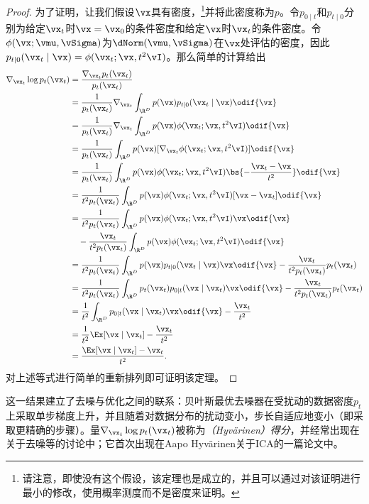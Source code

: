 \documentclass[../../book-main_zh.tex]{subfiles}
\begin{document}
\begin{proof}
    为了证明，让我们假设\(\vx\)具有密度，\footnote{请注意，即使没有这个假设，该定理也是成立的，并且可以通过对该证明进行最小的修改，使用概率测度而不是密度来证明。}并将此密度称为\(p\)。令\(p_{0 \mid t}\)和\(p_{t \mid 0}\)分别为给定\(\vx_{t}\)时\(\vx
    = \vx_{0}\)的条件密度和给定\(\vx\)时\(\vx_{t}\)的条件密度。令\(\phi(\vx ; \vmu, \vSigma)\)为\(\dNorm(\vmu,
    \vSigma)\)在\(\vx\)处评估的密度，因此\(p_{t \mid 0}(\vx_{t} \mid \vx)
    = \phi(\vx_{t} ; \vx, t^{2}\vI)\)。那么简单的计算给出
    \begin{align}
        \nabla_{\vx_{t}} \log p_{t}(\vx_{t})
        &= \frac{\nabla_{\vx_{t}}p_{t}(\vx_{t})}{p_{t}(\vx_{t})} \\
        &=
        \frac{1}{p_{t}(\vx_{t})}\nabla_{\vx_{t}}\int_{\R^{D}}p(\vx)p_{t
        \mid 0}(\vx_{t} \mid \vx)\odif{\vx} \\
        &=
        \frac{1}{p_{t}(\vx_{t})}\nabla_{\vx_{t}}\int_{\R^{D}}p(\vx)\phi(\vx_{t}
        ;\vx, t^{2}\vI)\odif{\vx} \\
        &=
        \frac{1}{p_{t}(\vx_{t})}\int_{\R^{D}}p(\vx)[\nabla_{\vx_{t}}\phi(\vx_{t}
        ;\vx, t^{2}\vI)]\odif{\vx} \\
        &= \frac{1}{p_{t}(\vx_{t})}\int_{\R^{D}}p(\vx)\phi(\vx_{t} ;
        \vx, t^{2}\vI)\bs{-\frac{\vx_{t} - \vx}{t^{2}}}\odif{\vx} \\
        &=
        \frac{1}{t^{2}p_{t}(\vx_{t})}\int_{\R^{D}}p(\vx)\phi(\vx_{t}
        ; \vx, t^{2}\vI)[\vx - \vx_{t}]\odif{\vx} \\
        &= \frac{1}{t^{2}p_{t}(\vx_{t})}\int_{\R^{D}}p(\vx)\phi(\vx_{t} ; \vx,
        t^{2}\vI)\vx \odif{\vx} \\
        & \quad -
        \frac{\vx_{t}}{t^{2}p_{t}(\vx_{t})}\int_{\R^{D}}p(\vx)\phi(\vx_{t}
        ; \vx, t^{2}\vI)\odif{\vx}\nonumber \\
        &= \frac{1}{t^{2}p_{t}(\vx_{t})}\int_{\R^{D}}p(\vx)p_{t \mid
        0}(\vx_{t} \mid \vx)\vx \odif{\vx} -
        \frac{\vx_{t}}{t^{2}p_{t}(\vx_{t})}p_{t}(\vx_{t}) \\
        &=
        \frac{1}{t^{2}p_{t}(\vx_{t})}\int_{\R^{D}}p_{t}(\vx_{t})p_{0
        \mid t}(\vx \mid \vx_{t})\vx \odif{\vx} -
        \frac{\vx_{t}}{t^{2}p_{t}(\vx_{t})}p_{t}(\vx_{t}) \\
        &= \frac{1}{t^{2}}\int_{\R^{D}}p_{0 \mid t}(\vx \mid
        \vx_{t})\vx \odif{\vx} - \frac{\vx_{t}}{t^{2}} \\
        &= \frac{1}{t^{2}}\Ex[\vx \mid \vx_{t}] - \frac{\vx_{t}}{t^{2}} \\
        &= \frac{\Ex[\vx \mid \vx_{t}] - \vx_{t}}{t^{2}}.
    \end{align}
    对上述等式进行简单的重新排列即可证明该定理。
\end{proof}
这一结果建立了去噪与优化之间的联系：贝叶斯最优去噪器在受扰动的数据密度\(p_{t}\)上采取单步梯度上升，并且随着对数据分布的扰动变小，步长自适应地变小（即采取更精确的步骤）。量\(\nabla_{\vx_{t}}\log p_{t}(\vx_{t})\)被称为\textit{（Hyv\"arinen）得分}，并经常出现在关于去噪等的讨论中；它首次出现在Aapo
Hyv\"arinen关于ICA的一篇论文中\cite{hyvarinen05a}。
\end{document}
